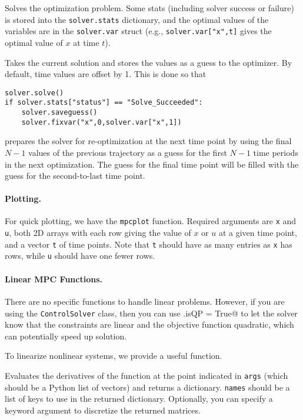 \documentclass{article}
\begin{document}
\begin{multicols}{2}

Solves the optimization problem.
Some stats (including solver success or failure) is stored into the \texttt{solver.stats} dictionary, and the optimal values of the variables are in the \texttt{solver.var} struct (e.g., \lstinline|solver.var["x",t]| gives the optimal value of $x$ at time $t$).


Takes the current solution and stores the values as a guess to the optimizer.
By default, time values are offset by 1. This is done so that
%
\begin{lstlisting}
solver.solve()
if solver.stats["status"] == "Solve_Succeeded":
    solver.saveguess()
    solver.fixvar("x",0,solver.var["x",1])
\end{lstlisting}
%
prepares the solver for re-optimization at the next time point by using the final $N-1$ values of the previous trajectory as a guess for the first $N-1$ time periods in the next optimization.
The guess for the final time point will be filled with the guess for the second-to-last time point.

\paragraph{Plotting.}

For quick plotting, we have the \texttt{mpcplot} function.
Required arguments are \texttt{x} and \texttt{u}, both 2D arrays with each row giving the value of $x$ or $u$ at a given time point, and a vector \texttt{t} of time points.
Note that \texttt{t} should have as many entries as \texttt{x} has rows, while \texttt{u} should have one fewer rows.

\paragraph*{Linear MPC Functions.}

There are no specific functions to handle linear problems.
However, if you are using the \texttt{ControlSolver} class, then you can use \lstinline@solver.isQP = True@ to let the solver know that the constraints are linear and the objective function quadratic, which can potentially speed up solution.

To linearize nonlinear systems, we provide a useful function.


Evaluates the derivatives of the \casadi{} function \lstinline@f@ at the point indicated in \lstinline$args$ (which should be a Python list of vectors) and returns a dictionary.
\lstinline$names$ should be a list of keys to use in the returned dictionary.
Optionally, you can specify a \lstinline@Delta@ keyword argument to discretize the returned matrices.


\end{multicols}
\end{document}
